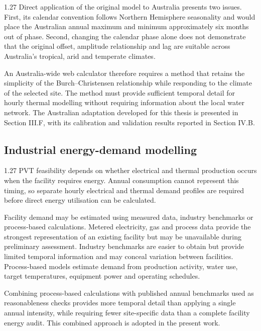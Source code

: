 \documentclass[12pt,letterpaper]{article}
\newcommand{\done}{\ \textcolor{green!45!black}{$\checkmark$}} %
\begin{document}
\begin{spacing}{1.27}
Direct application of the original model to Australia presents two issues. First, its calendar convention follows Northern Hemisphere seasonality and would place the Australian annual maximum and minimum approximately six months out of phase. Second, changing the calendar phase alone does not demonstrate that the original offset, amplitude relationship and lag are suitable across Australia's tropical, arid and temperate climates.\par

\vspace{0.15in}

An Australia-wide web calculator therefore requires a method that retains the simplicity of the Burch--Christensen relationship while responding to the climate of the selected site. The method must provide sufficient temporal detail for hourly thermal modelling without requiring information about the local water network. The Australian adaptation developed for this thesis is presented in Section III.F, with its calibration and validation results reported in Section IV.B.
\end{spacing}

\subsection[Industrial energy-demand modelling\done]{Industrial energy-demand modelling}\label{sec13}

\begin{spacing}{1.27}
PVT feasibility depends on whether electrical and thermal production occurs when the facility requires energy. Annual consumption cannot represent this timing, so separate hourly electrical and thermal demand profiles are required before direct energy utilisation can be calculated.\par

\vspace{0.15in}

Facility demand may be estimated using measured data, industry benchmarks or process-based calculations. Metered electricity, gas and process data provide the strongest representation of an existing facility but may be unavailable during preliminary assessment. Industry benchmarks are easier to obtain but provide limited temporal information and may conceal variation between facilities. Process-based models estimate demand from production activity, water use, target temperatures, equipment power and operating schedules.\par

\vspace{0.15in}

Combining process-based calculations with published annual benchmarks used as reasonableness checks provides more temporal detail than applying a single annual intensity, while requiring fewer site-specific data than a complete facility energy audit. This combined approach is adopted in the present work.\par
\end{spacing}
\end{document}
